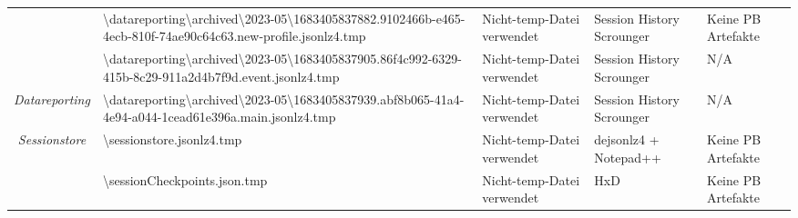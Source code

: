 \begin{appendices}
{\begin{landscape}
\begin{table}[h!]
{\begin{tabular}{cllll}
							\multicolumn{1}{|c|}{}                                                                                       & \multicolumn{1}{l|}{\cellcolor[HTML]{3190FF}\textbackslash{}datareporting\textbackslash{}archived\textbackslash{}2023-05\textbackslash{}1683405837882.9102466b-e465-4ecb-810f-74ae90c64c63.new-profile.jsonlz4.tmp} & \multicolumn{1}{l|}{\cellcolor[HTML]{FCFF2F}Nicht-temp-Datei verwendet}                           & \multicolumn{1}{l|}{Session History Scrounger}   & \multicolumn{1}{l|}{\cellcolor[HTML]{F8A102}Keine PB Artefakte} \\ \cline{2-5} 
							\multicolumn{1}{|c|}{}                                                                                       & \multicolumn{1}{l|}{\cellcolor[HTML]{3190FF}\textbackslash{}datareporting\textbackslash{}archived\textbackslash{}2023-05\textbackslash{}1683405837905.86f4c992-6329-415b-8c29-911a2d4b7f9d.event.jsonlz4.tmp}       & \multicolumn{1}{l|}{\cellcolor[HTML]{FCFF2F}Nicht-temp-Datei verwendet}                           & \multicolumn{1}{l|}{Session History Scrounger}   & \multicolumn{1}{l|}{\cellcolor[HTML]{C0C0C0}N/A}                \\ \cline{2-5} 
							\multicolumn{1}{|c|}{\multirow{-4}{*}{\textit{Datareporting}}}                                               & \multicolumn{1}{l|}{\cellcolor[HTML]{3190FF}\textbackslash{}datareporting\textbackslash{}archived\textbackslash{}2023-05\textbackslash{}1683405837939.abf8b065-41a4-4e94-a044-1cead61e396a.main.jsonlz4.tmp}        & \multicolumn{1}{l|}{\cellcolor[HTML]{FCFF2F}Nicht-temp-Datei verwendet}                           & \multicolumn{1}{l|}{Session History Scrounger}   & \multicolumn{1}{l|}{\cellcolor[HTML]{C0C0C0}N/A}                \\ \hline
							\multicolumn{1}{|c|}{\textit{Sessionstore}}                                                                  & \multicolumn{1}{l|}{\cellcolor[HTML]{3190FF}\textbackslash{}sessionstore.jsonlz4.tmp}                                                                                                                               & \multicolumn{1}{l|}{\cellcolor[HTML]{FCFF2F}Nicht-temp-Datei verwendet}                           & \multicolumn{1}{l|}{dejsonlz4 + Notepad++}       & \multicolumn{1}{l|}{\cellcolor[HTML]{F8A102}Keine PB Artefakte} \\ \hline
							\multicolumn{1}{|c|}{}                                                                                       & \multicolumn{1}{l|}{\cellcolor[HTML]{3190FF}\textbackslash{}sessionCheckpoints.json.tmp}                                                                                                                            & \multicolumn{1}{l|}{\cellcolor[HTML]{FCFF2F}Nicht-temp-Datei verwendet}                           & \multicolumn{1}{l|}{HxD}                         & \multicolumn{1}{l|}{\cellcolor[HTML]{F8A102}Keine PB Artefakte} \\ \cline{2-5} 

\end{tabular}}
\end{table}
\end{landscape}}
\end{appendices}
